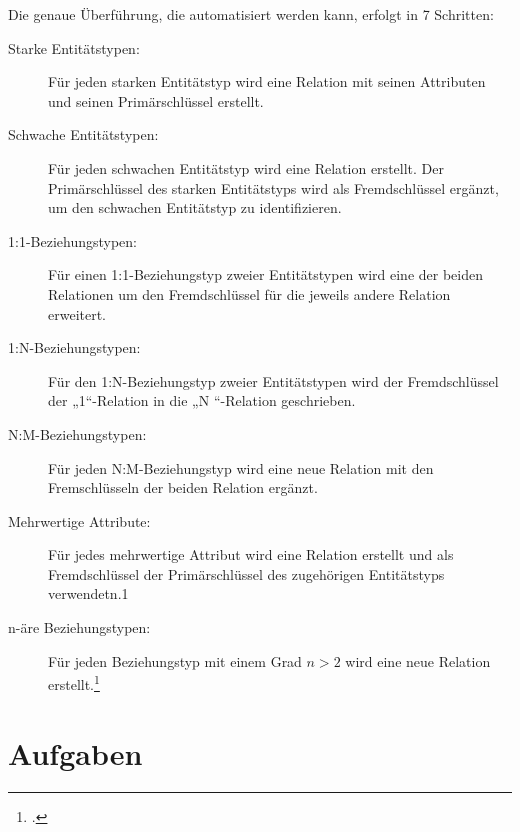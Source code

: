 \documentclass{lehramt-informatik}
\begin{document}
Die genaue Überführung, die automatisiert werden kann, erfolgt in 7
Schritten:

\begin{description}
\item[Starke Entitätstypen:] Für jeden starken Entitätstyp wird eine
Relation mit seinen Attributen und seinen Primärschlüssel erstellt.

\item[Schwache Entitätstypen:] Für jeden schwachen Entitätstyp wird eine
Relation erstellt. Der Primärschlüssel des starken Entitätstyps wird als
Fremdschlüssel ergänzt, um den schwachen Entitätstyp zu identifizieren.

\item[1:1-Beziehungstypen:] Für einen 1:1-Beziehungstyp zweier
Entitätstypen wird eine der beiden Relationen um den Fremdschlüssel
für die jeweils andere Relation erweitert.

\item[1:N-Beziehungstypen:] Für den 1:N-Beziehungstyp zweier
Entitätstypen wird der Fremdschlüssel der „1“-Relation in die „N
“-Relation geschrieben.

\item[N:M-Beziehungstypen:] Für jeden N:M-Beziehungstyp wird eine neue
Relation mit den Fremschlüsseln der beiden Relation ergänzt.

\item[Mehrwertige Attribute:] Für jedes mehrwertige Attribut wird eine
Relation erstellt und als Fremdschlüssel der Primärschlüssel des
zugehörigen Entitätstyps verwendetn.1

\item[n-äre Beziehungstypen:] Für jeden Beziehungstyp mit einem Grad $n
> 2$ wird eine neue Relation erstellt.\footcite[Überführung in ein
relationales Modell]{wiki:entity-relationship-modell}

\end{description}


\chapter{Aufgaben}

%
\end{document}
